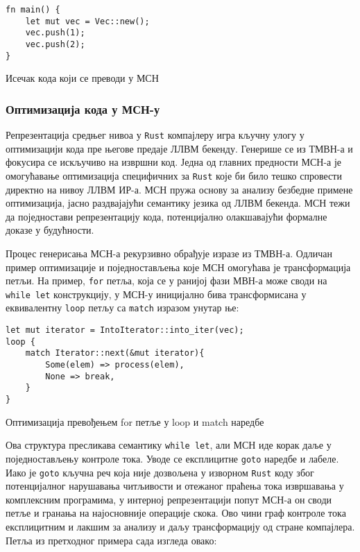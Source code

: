 \begin{listing}[H]
\begin{verbatim}
fn main() {
    let mut vec = Vec::new();
    vec.push(1);
    vec.push(2);
}
\end{verbatim}
\caption{Исечак кода који се преводи у МСН}
\label{lst:snippet-before-mir}
\end{listing}

\subsubsection{Оптимизација кода у МСН-у}

Репрезентација средњег нивоа у \verb|Rust| компајлеру игра кључну улогу у оптимизацији кода пре његове предаје ЛЛВМ бекенду. 
Генерише се из ТМВН-а и фокусира се искључиво на извршни код. Једна од главних предности МСН-а је омогућавање оптимизација специфичних за \verb|Rust| које би било тешко 
спровести директно на нивоу ЛЛВМ ИР-а. МСН пружа основу за анализу безбедне примене оптимизација, 
јасно раздвајајући семантику језика од ЛЛВМ бекенда. МСН тежи да поједностави репрезентацију кода, потенцијално олакшавајући формалне доказе у будућности.

Процес генерисања МСН-а рекурзивно обрађује изразе из ТМВН-а. Одличан пример оптимизације и поједностављења које МСН омогућава је 
трансформација петљи. На пример, \verb|for| петља, која се у ранијој фази МВН-а може своди на \verb|while let| конструкцију,
у МСН-у иницијално бива трансформисана у еквивалентну \verb|loop| петљу са \verb|match| изразом унутар ње:

\begin{listing}[H]
\begin{verbatim}
let mut iterator = IntoIterator::into_iter(vec);
loop {
    match Iterator::next(&mut iterator){
        Some(elem) => process(elem),
        None => break,
    }
}
\end{verbatim}
\caption{Оптимизација превођењем for петље у loop и match наредбе}
\label{lst:optimization-0}
\end{listing}

Ова структура пресликава семантику \verb|while let|, али МСН иде корак даље у поједностављењу контроле тока. Уводе се експлицитне \verb|goto| 
наредбе и лабеле. Иако је \verb|goto| кључна реч која није дозвољена у изворном \verb|Rust| коду због потенцијалног нарушавања читљивости и 
отежаног праћења тока извршавања у комплексним програмима, у интерној репрезентацији попут МСН-а он своди петље и гранања на најосновније 
операције скока. Ово чини граф контроле тока експлицитним и лакшим за анализу и даљу трансформацију од стране компајлера. 
Петља из претходног примера сада изгледа овако:

